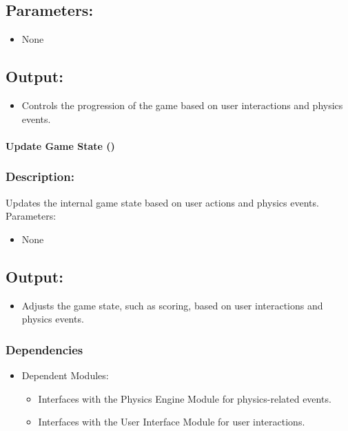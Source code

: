 \documentclass[12pt, titlepage]{article}
\begin{document}
\subsection*{Parameters:}
\begin{itemize}
  \item None
\end{itemize}

\subsection*{Output:}
\begin{itemize}
  \item Controls the progression of the game based on user interactions and physics events.
\end{itemize}

\paragraph{Update Game State ()}
\subsubsection*{Description:} Updates the internal game state based on user actions and physics events. Parameters:

\begin{itemize}
  \item None
\end{itemize}

\subsection*{Output:}
\begin{itemize}
  \item Adjusts the game state, such as scoring, based on user interactions and physics events.
\end{itemize}

\subsubsection{Dependencies}
\begin{itemize}
  \item Dependent Modules:
    \begin{itemize}
  \item Interfaces with the Physics Engine Module for physics-related events.
  \item Interfaces with the User Interface Module for user interactions.
    \end{itemize}
\end{itemize}
\end{document}

